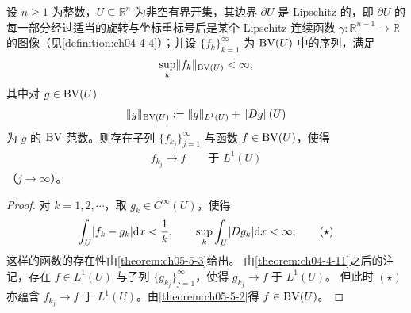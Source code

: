 \documentclass[../../main.tex]{subfiles}%
\begin{document}
\begin{theorem}[$\BV$ 函数的紧性]\label{theorem:ch05-5-5}
设 $n\geqslant1$ 为整数，$U\subseteq\mathbb{R}^n$ 为非空有界开集，其边界 $\partial U$ 是 Lipschitz 的，即 $\partial U$ 的每一部分经过适当的旋转与坐标重标号后是某个 Lipschitz 连续函数 $\gamma:\mathbb{R}^{n-1}\to\mathbb{R}$ 的图像（见\cref{definition:ch04-4-4}）；并设 $\{f_k\}_{k=1}^{\infty}$ 为 $\mathrm{BV}(U)$ 中的序列，满足%
\begin{align*}
\sup_{k}\lVert f_k\rVert_{\mathrm{BV}(U)}<\infty,
\end{align*}
其中对 $g\in\mathrm{BV}(U)$
\begin{align*}
\lVert g\rVert_{\mathrm{BV}(U)}:=\lVert g\rVert_{L^1(U)}+\lVert Dg\rVert(U)
\end{align*}
为 $g$ 的 $\BV$ 范数。则存在子列 $\{f_{k_j}\}_{j=1}^{\infty}$ 与函数 $f\in\mathrm{BV}(U)$，使得
\begin{align*}
f_{k_j}\to f\qquad\text{于 }L^1(U)
\end{align*}
（$j\to\infty$）。
\end{theorem}

\begin{proof}
对 $k=1,2,\cdots$，取 $g_k\in C^{\infty}(U)$，使得
\begin{align*}
\int_U\lvert f_k-g_k\rvert\mathrm{d} x<\frac{1}{k},\qquad\sup_{k}\int_U\lvert Dg_k\rvert\mathrm{d} x<\infty;\qquad(\star)
\end{align*}
这样的函数的存在性由\cref{theorem:ch05-5-3}给出。%
由\cref{theorem:ch04-4-11}之后的注记，存在 $f\in L^1(U)$ 与子列 $\{g_{k_j}\}_{j=1}^{\infty}$，使得 $g_{k_j}\to f$ 于 $L^1(U)$。%
但此时 $(\star)$ 亦蕴含 $f_{k_j}\to f$ 于 $L^1(U)$。由\cref{theorem:ch05-5-2}得 $f\in\mathrm{BV}(U)$。%
\end{proof}
\end{document}
